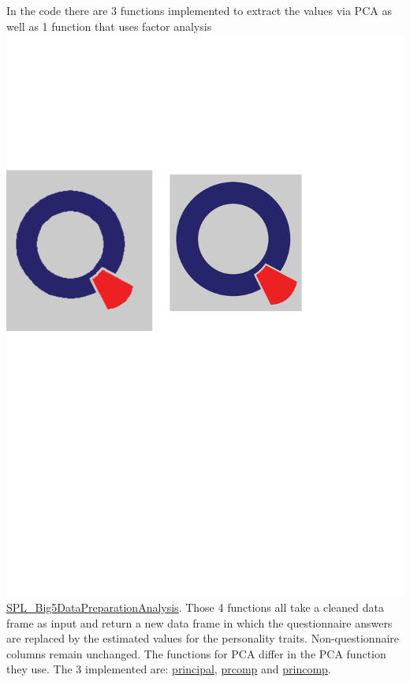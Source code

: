 In the code there are 3 functions implemented to extract the values via PCA as well as 1 function that uses factor analysis \href{https://github.com/Matthias2193/SPL/blob/3d1d23303132ad8092531f9474fbf78f5a8df3c5/SPL_Big5DataPreparationAnalysis/SPL_Big5DataPreparationAnalysis.R#L10-L16}{\includegraphics[scale = 0.06]{Figures/qletlogo.pdf}SPL\_Big5DataPreparationAnalysis}. Those 4 functions all take a cleaned data frame as input and return a new data frame in which the questionnaire answers are replaced by the estimated values for the personality traits. Non-questionnaire columns remain unchanged. The functions for PCA differ in the PCA function they use. The 3 implemented are: \href{http://www.personality-project.org/r/html/principal.html}{principal}, \href{https://stat.ethz.ch/R-manual/R-devel/library/stats/html/prcomp.html}{prcomp} and \href{https://stat.ethz.ch/R-manual/R-devel/library/stats/html/princomp.html}{princomp}.  
